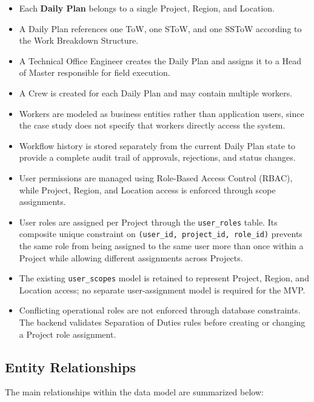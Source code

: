 \documentclass[11pt]{article}
\begin{document}
\begin{itemize}
    \item Each \textbf{Daily Plan} belongs to a single Project, Region, and
          Location.
    \item A Daily Plan references one ToW, one SToW, and one SSToW according to
          the Work Breakdown Structure.
    \item A Technical Office Engineer creates the Daily Plan and assigns it to a
          Head of Master responsible for field execution.
    \item A Crew is created for each Daily Plan and may contain multiple
          workers.
    \item Workers are modeled as business entities rather than application
          users, since the case study does not specify that workers directly
          access the system.
    \item Workflow history is stored separately from the current Daily Plan
          state to provide a complete audit trail of approvals, rejections, and
          status changes.
    \item User permissions are managed using Role-Based Access Control (RBAC),
          while Project, Region, and Location access is enforced through scope
          assignments.
    \item User roles are assigned per Project through the
          \texttt{user\_roles} table. Its composite unique constraint on
          \texttt{(user\_id, project\_id, role\_id)} prevents the same role from
          being assigned to the same user more than once within a Project while
          allowing different assignments across Projects.
    \item The existing \texttt{user\_scopes} model is retained to represent
          Project, Region, and Location access; no separate user-assignment
          model is required for the MVP.
    \item Conflicting operational roles are not enforced through database
          constraints. The backend validates Separation of Duties rules before
          creating or changing a Project role assignment.
\end{itemize}

\subsection{Entity Relationships}

The main relationships within the data model are summarized below:
\end{document}
